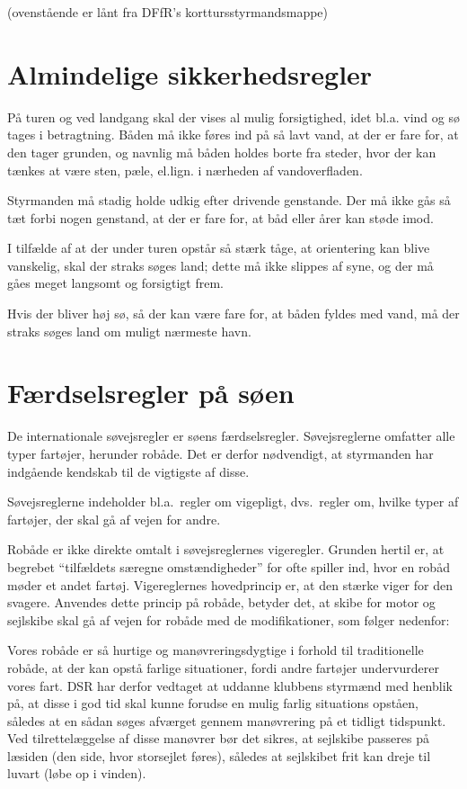 \documentclass{article}
\begin{document}
(ovenstående er lånt fra DFfR's korttursstyrmandsmappe)

\section{Almindelige sikkerhedsregler}

På turen og ved landgang skal der vises al mulig forsigtighed, idet bl.a.
vind og sø tages i betragtning. Båden må ikke føres ind på så lavt vand,
at der er fare for, at den tager grunden, og navnlig må båden holdes
borte fra steder, hvor der kan tænkes at være sten, pæle, el.lign. i
nærheden af vandoverfladen.

Styrmanden må stadig holde udkig efter drivende genstande. Der må ikke
gås så tæt forbi nogen genstand, at der er fare for, at båd eller årer
kan støde imod.

I tilfælde af at der under turen opstår så stærk tåge, at orientering kan
blive vanskelig, skal der straks søges land; dette må ikke slippes af
syne, og der må gåes meget langsomt og forsigtigt frem.

Hvis der bliver høj sø, så der kan være fare for, at båden fyldes med
vand, må der straks søges land om muligt nærmeste havn.

\section{Færdselsregler på søen}

De internationale søvejsregler er søens færdselsregler. Søvejsreglerne
omfatter alle typer fartøjer, herunder robåde. Det er derfor nødvendigt,
at styrmanden har indgående kendskab til de vigtigste af disse.

Søvejsreglerne indeholder bl.a.\ regler om vigepligt, dvs.\ regler om,
hvilke typer af fartøjer, der skal gå af vejen for andre.

Robåde er ikke direkte omtalt i søvejsreglernes vigeregler. Grunden
hertil er, at begrebet ``tilfældets særegne omstændigheder'' for ofte
spiller ind, hvor en robåd møder et andet fartøj. Vigereglernes
hovedprincip er, at den stærke viger for den svagere. Anvendes dette
princip på robåde, betyder det, at skibe for motor og sejlskibe skal gå
af vejen for robåde med de modifikationer, som følger nedenfor:

Vores robåde er så hurtige og manøvreringsdygtige i forhold til
traditionelle robåde, at der kan opstå farlige situationer, fordi andre
fartøjer undervurderer vores fart. DSR har derfor vedtaget at uddanne
klubbens styrmænd med henblik på, at disse i god tid skal kunne forudse
en mulig farlig situations opståen, således at en sådan søges afværget
gennem manøvrering på et tidligt tidspunkt. Ved tilrettelæggelse af disse
manøvrer bør det sikres, at sejlskibe passeres på læsiden (den side, hvor
storsejlet føres), således at sejlskibet frit kan dreje til luvart (løbe
op i vinden).
\end{document}
